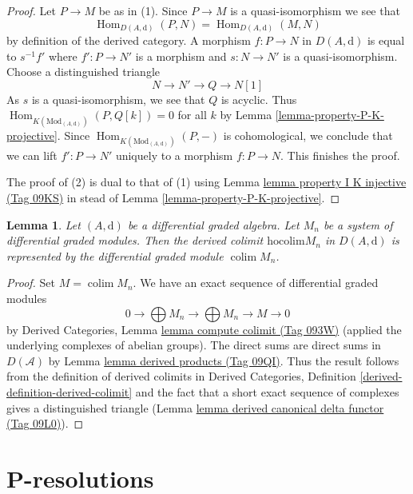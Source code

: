 \documentclass{amsart}
\theoremstyle{plain}
\newtheorem{lemma}[subsection]{Lemma}
\theoremstyle{definition}
\theoremstyle{remark}
\numberwithin{equation}{subsection}
\def\colim{\mathop{\mathrm{colim}}\nolimits}
\def\Hom{\mathop{\mathrm{Hom}}\nolimits}
\begin{document}
\begin{proof}
Let $P \to M$ be as in (1). Since $P \to M$ is a quasi-isomorphism we see that
$$
\Hom_{D(A, \text{d})}(P, N) = \Hom_{D(A, \text{d})}(M, N)
$$
by definition of the derived category. A morphism
$f : P \to N$ in $D(A, \text{d})$ is equal to
$s^{-1}f'$ where $f' : P \to N'$ is a morphism and
$s : N \to N'$ is a quasi-isomorphism. Choose a distinguished triangle
$$
N \to N' \to Q \to N[1]
$$
As $s$ is a quasi-isomorphism, we see that $Q$ is acyclic. Thus
$\Hom_{K(\text{Mod}_{(A, \text{d})})}(P, Q[k]) = 0$ for all $k$ by
Lemma \ref{lemma-property-P-K-projective}. Since
$\Hom_{K(\text{Mod}_{(A, \text{d})})}(P, -)$
is cohomological, we conclude that we can lift $f' : P \to N'$
uniquely to a morphism $f : P \to N$. This finishes the proof.

\medskip\noindent
The proof of (2) is dual to that of (1) using
Lemma \href{https://stacks.math.columbia.edu/tag/09KS}{lemma property I K injective (Tag 09KS)} in stead of
Lemma \ref{lemma-property-P-K-projective}.
\end{proof}


\begin{lemma}
\label{lemma-homotopy-colimit}
Let $(A, \text{d})$ be a differential graded algebra. Let
$M_n$ be a system of differential graded modules. Then the derived
colimit $\text{hocolim} M_n$ in $D(A, \text{d})$ is represented
by the differential graded module $\colim M_n$.
\end{lemma}

\begin{proof}
Set $M = \colim M_n$. We have an exact sequence of differential graded modules
$$
0 \to \bigoplus M_n \to \bigoplus M_n \to M \to 0
$$
by Derived Categories, Lemma \href{https://stacks.math.columbia.edu/tag/093W}{lemma compute colimit (Tag 093W)}
(applied the underlying complexes of abelian groups).
The direct sums are direct sums in $D(\mathcal{A})$ by
Lemma \href{https://stacks.math.columbia.edu/tag/09QI}{lemma derived products (Tag 09QI)}.
Thus the result follows from the definition
of derived colimits in Derived Categories,
Definition \ref{derived-definition-derived-colimit}
and the fact that a short exact sequence of complexes
gives a distinguished triangle
(Lemma \href{https://stacks.math.columbia.edu/tag/09L0}{lemma derived canonical delta functor (Tag 09L0)}).
\end{proof}


\section{P-resolutions}
\label{section-P-resolutions}
\end{document}
